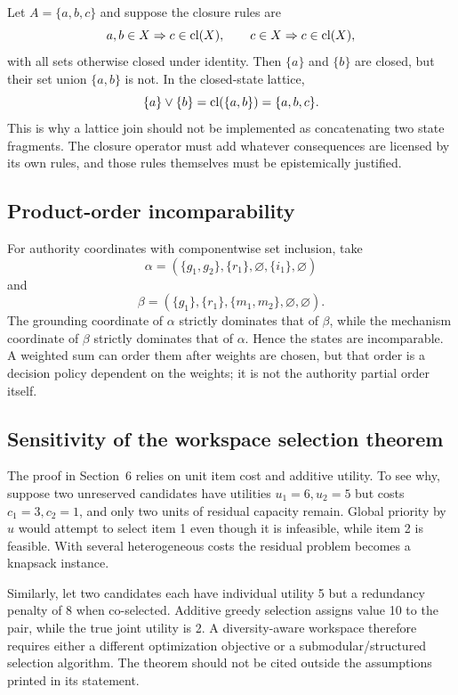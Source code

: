 Let \(A=\{a,b,c\}\) and suppose the closure rules are
\[
a,b\in X\Rightarrow c\in\operatorname{cl}(X),
\qquad c\in X\Rightarrow c\in\operatorname{cl}(X),
\]
with all sets otherwise closed under identity. Then \(\{a\}\) and \(\{b\}\) are closed, but their set union \(\{a,b\}\) is not. In the closed-state lattice,
\[
\{a\}\vee\{b\}
=\operatorname{cl}(\{a,b\})
=\{a,b,c\}.
\]
This is why a lattice join should not be implemented as concatenating two state fragments. The closure operator must add whatever consequences are licensed by its own rules, and those rules themselves must be epistemically justified.

\subsection{Product-order incomparability}

For authority coordinates with componentwise set inclusion, take
\[
\alpha=(\{g_1,g_2\},\{r_1\},\varnothing,\{i_1\},\varnothing)
\]
and
\[
\beta=(\{g_1\},\{r_1\},\{m_1,m_2\},\varnothing,\varnothing).
\]
The grounding coordinate of \(\alpha\) strictly dominates that of \(\beta\), while the mechanism coordinate of \(\beta\) strictly dominates that of \(\alpha\). Hence the states are incomparable. A weighted sum can order them after weights are chosen, but that order is a decision policy dependent on the weights; it is not the authority partial order itself.

\subsection{Sensitivity of the workspace selection theorem}

The proof in Section~6 relies on unit item cost and additive utility. To see why, suppose two unreserved candidates have utilities \(u_1=6,u_2=5\) but costs \(c_1=3,c_2=1\), and only two units of residual capacity remain. Global priority by \(u\) would attempt to select item 1 even though it is infeasible, while item 2 is feasible. With several heterogeneous costs the residual problem becomes a knapsack instance.

Similarly, let two candidates each have individual utility 5 but a redundancy penalty of 8 when co-selected. Additive greedy selection assigns value 10 to the pair, while the true joint utility is 2. A diversity-aware workspace therefore requires either a different optimization objective or a submodular/structured selection algorithm. The theorem should not be cited outside the assumptions printed in its statement.

